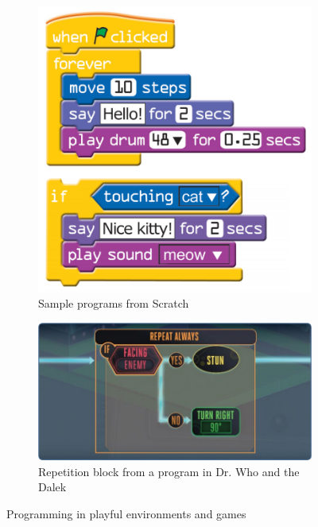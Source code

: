 \documentclass{sigchi}
\begin{document}
        \begin{figure}
            \centering
            \begin{subfigure}[!h]{0.5\columnwidth}
                \includegraphics[width=\textwidth]{scratch}
                \caption{Sample programs from Scratch}
                \label{fig:scratch}
            \end{subfigure}%

            \begin{subfigure}[!h]{0.7\columnwidth}
                \includegraphics[width=\textwidth]{dr-who}
                \caption{Repetition block from a program in Dr. Who and the
                         Dalek}
                \label{fig:dr-who}
            \end{subfigure}
            \caption{Programming in playful environments and games}
            \label{fig:samples}
        \end{figure}
\end{document}
